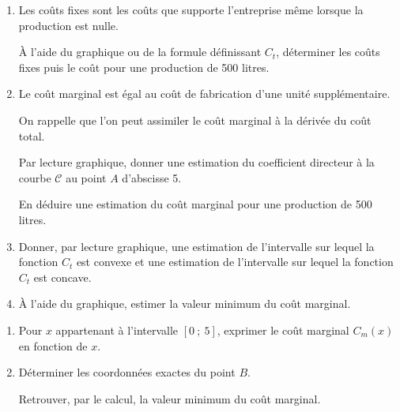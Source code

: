 \begin{center}
\end{center}
\par
%
%
\par
\begin{enumerate}
     \item
     Les coûts fixes sont les coûts que supporte l'entreprise même lorsque la production est nulle.
     \par
     \`A l'aide du graphique ou de la formule définissant $C_t$, déterminer les coûts fixes puis le coût pour une production de 500 litres.
     \item
     Le coût marginal est égal au coût de fabrication d'une unité supplémentaire.
     \par
     On rappelle que l'on peut assimiler le coût marginal à la dérivée du coût total.
     \par
     Par lecture graphique, donner une estimation du coefficient directeur à la courbe $\mathscr{C}$ au point $A$ d'abscisse 5.
     \par
     En déduire une estimation du coût marginal pour une production de 500 litres.
     \item
     Donner, par lecture graphique, une estimation de l'intervalle sur lequel la fonction $C_t$ est convexe et une estimation de l'intervalle sur lequel la fonction $C_t$ est concave.
     \item
     \`A l'aide du graphique, estimer la valeur minimum du coût marginal.
     \par
\end{enumerate}
\par
%
%
\par
\begin{enumerate}
     \item
     Pour $x$ appartenant à l'intervalle $[0~;~5]$, exprimer le coût marginal $C_m(x)$ en fonction de $x$.
     \item
     Déterminer les coordonnées exactes du point $B$.
     \par
     Retrouver, par le calcul, la valeur minimum du coût marginal.
     \par
\end{enumerate}
